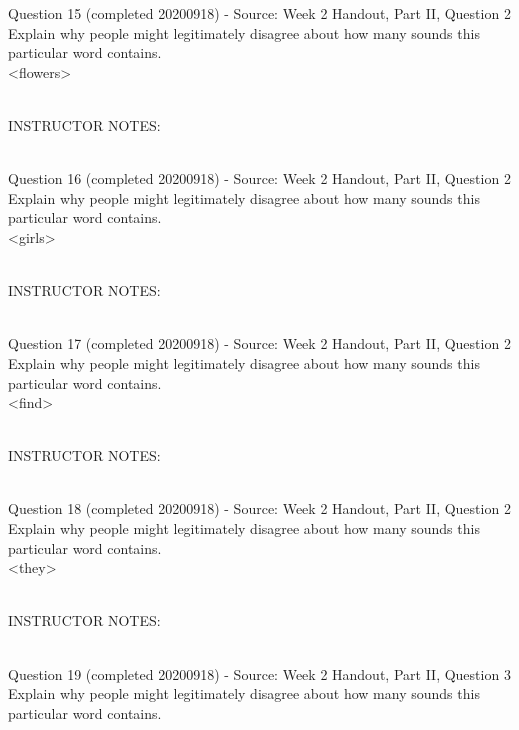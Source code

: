 \documentclass[12pt]{article}
\begin{document}
{\large Question 15} (completed 20200918) - Source: Week 2 Handout, Part II, Question 2\\

Explain why people might legitimately disagree about how many sounds this particular word contains.\\

<flowers>


~\\
INSTRUCTOR NOTES: 


~\\

{\large Question 16} (completed 20200918) - Source: Week 2 Handout, Part II, Question 2\\

Explain why people might legitimately disagree about how many sounds this particular word contains.\\

<girls>


~\\
INSTRUCTOR NOTES: 


~\\

{\large Question 17} (completed 20200918) - Source: Week 2 Handout, Part II, Question 2\\

Explain why people might legitimately disagree about how many sounds this particular word contains.\\

<find>


~\\
INSTRUCTOR NOTES: 


~\\

{\large Question 18} (completed 20200918) - Source: Week 2 Handout, Part II, Question 2\\

Explain why people might legitimately disagree about how many sounds this particular word contains.\\

<they>


~\\
INSTRUCTOR NOTES: 


~\\

{\large Question 19} (completed 20200918) - Source: Week 2 Handout, Part II, Question 3\\

Explain why people might legitimately disagree about how many sounds this particular word contains.\\
\end{document}
